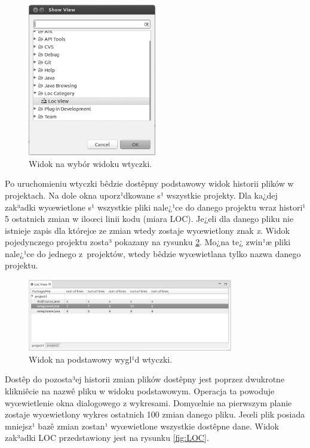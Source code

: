 		\begin{figure}[!htp]
			\centering
			\includegraphics[width=0.5\textwidth]{graphics/wybor.jpg}
			\caption{Widok na wybór widoku wtyczki.}
			\label{fig:view_wybor}
		\end{figure}
				
		Po uruchomieniu wtyczki bêdzie dostêpny podstawowy widok historii plików w projektach. Na dole 
		okna uporz¹dkowane s¹ wszystkie projekty. Dla ka¿dej zak³adki wyœwietlone s¹ wszystkie pliki
		nale¿¹ce do danego projektu wraz histori¹ 5 ostatnich zmian w iloœci linii kodu (miara LOC).
		Je¿eli dla danego pliku nie istnieje zapis dla którejœ ze zmian wtedy zostaje wyœwietlony 
		znak \textit{x}. Widok pojedynczego projektu zosta³ pokazany na rysunku \ref{fig:view}. Mo¿na te¿
		zwin¹æ pliki nale¿¹ce do jednego z~projektów, wtedy bêdzie wyœwietlana tylko nazwa danego
		projektu.

		\begin{figure}[!htp]
			\centering
			\includegraphics[width=0.8\textwidth]{graphics/view.jpg}
			\caption{Widok na podstawowy wygl¹d wtyczki.}
			\label{fig:view}
		\end{figure}

		Dostêp do pozosta³ej historii zmian plików dostêpny jest poprzez dwukrotne klikniêcie na nazwê
		pliku w widoku podstawowym. Operacja ta powoduje wyœwietlenie okna dialogowego z wykresami.
		Domyœlnie na pierwszym planie zostaje wyœwietlony wykres ostatnich 100 zmian danego pliku. Jeœli 
		plik posiada mniejsz¹ bazê zmian zostan¹ wyœwietlone wszystkie dostêpne dane. Widok zak³adki LOC
		przedstawiony jest na rysunku \ref{fig:LOC}.

